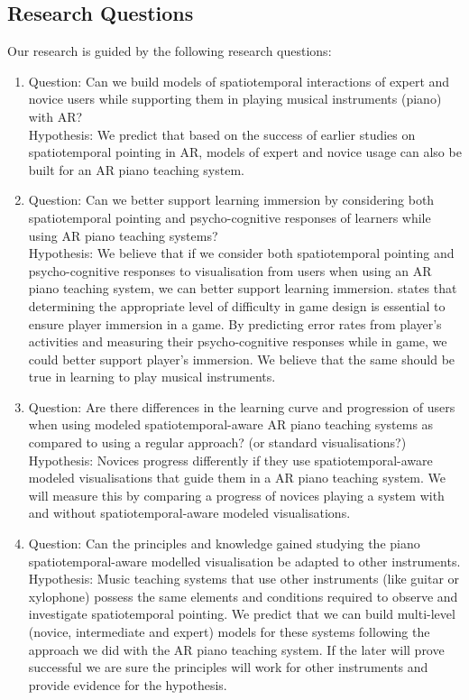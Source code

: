 \documentclass[manuscript,screen]{acmart}
\begin{document}
\subsection{Research Questions}
Our research is guided by the following research questions: 
\begin{enumerate}
    \item Question: Can we build models of spatiotemporal interactions of expert and novice users while supporting them in playing musical instruments (piano) with AR?  \\
    Hypothesis: We predict that based on the success of earlier studies on spatiotemporal pointing in AR, models of expert and novice usage can also be built for an AR piano teaching system. 
    \item Question: Can we better support learning immersion by considering both spatiotemporal pointing and psycho-cognitive responses of learners while using AR piano teaching systems?\\
    Hypothesis: We believe that if we consider both spatiotemporal pointing and psycho-cognitive responses to visualisation from users when using an AR piano teaching system, we can better support learning immersion.  \citet{lee2016website} states that determining the appropriate level of difficulty in game design is essential to ensure player immersion in a game. By predicting error rates from player’s activities and measuring their psycho-cognitive responses while in game, we could better support player’s immersion. We believe that the same should be true in learning to play musical instruments.
    \item Question: Are there differences in the learning curve and progression of users when using modeled spatiotemporal-aware AR piano teaching systems as compared to using a regular approach? (or standard visualisations?)\\
    Hypothesis: Novices progress differently if they use spatiotemporal-aware modeled visualisations that guide them in a AR piano teaching system. We will measure this by comparing a progress of novices playing a system with and without  spatiotemporal-aware modeled visualisations.
    \item Question: Can the principles and knowledge gained studying the piano spatiotemporal-aware modelled visualisation be adapted to other instruments.\\
    Hypothesis: Music teaching systems that use other instruments (like guitar or xylophone) possess the same elements and conditions required to observe and investigate spatiotemporal pointing. We predict that we can build multi-level (novice, intermediate and expert) models for these systems following the approach we did with the AR piano teaching system. If the later will prove successful we are sure the principles will work for other instruments and provide evidence for the hypothesis. 
\end{enumerate}
\end{document}
